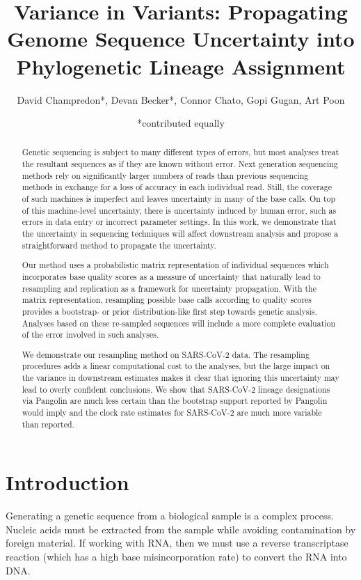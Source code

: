 \documentclass[10pt]{article}
\title{Variance in Variants: Propagating Genome Sequence Uncertainty
into Phylogenetic Lineage Assignment}
\author{David Champredon*, Devan Becker*, Connor Chato, Gopi Gugan, Art
Poon}
\date{*contributed equally}
\begin{document}
\maketitle

\normalsize
\vspace{1cm}
\tableofcontents

\begin{abstract}
Genetic sequencing is subject to many different types of errors, but most analyses treat the resultant sequences as if they are known without error.
Next generation sequencing methods rely on significantly larger numbers of reads than previous sequencing methods in exchange for a loss of accuracy in each individual read.
Still, the coverage of such machines is imperfect and leaves uncertainty in many of the base calls.
On top of this machine-level uncertainty, there is uncertainty induced by human error, such as errors in data entry or incorrect parameter settings.
In this work, we demonstrate that the uncertainty in sequencing techniques will affect downstream analysis and propose a straightforward method to propagate the uncertainty.

Our method uses a probabilistic matrix representation of individual sequences which incorporates base quality scores as a measure of uncertainty that naturally lead to resampling and replication as a framework for uncertainty propagation.
With the matrix representation, resampling possible base calls according to quality scores provides a bootstrap- or prior distribution-like first step towards genetic analysis.
Analyses based on these re-sampled sequences will include a more complete evaluation of the error involved in such analyses.

We demonstrate our resampling method on SARS-CoV-2 data.
The resampling procedures adds a linear computational cost to the analyses, but the large impact on the variance in downstream estimates makes it clear that ignoring this uncertainty may lead to overly confident conclusions.
We show that SARS-CoV-2 lineage designations via Pangolin are much less certain than the bootstrap support reported by Pangolin would imply and the clock rate estimates for SARS-CoV-2 are much more variable than reported.
\end{abstract}


\section{Introduction}

Generating a genetic sequence from a biological sample is a complex process.
Nucleic acids must be extracted from the sample while avoiding contamination by foreign material.
If working with RNA, then we must use a reverse transcriptase reaction (which has a high base misincorporation rate) to convert the RNA into DNA. 
\end{document}
